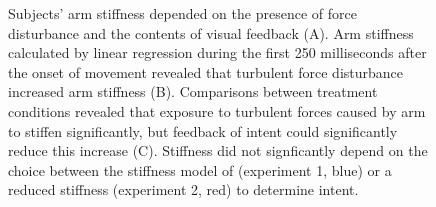 \documentclass{frontiersSCNS} %
\begin{document}

\begin{figure}[t]
\centering
{}
\caption{Subjects' arm stiffness depended on the presence of force disturbance and the contents of visual feedback (A). Arm stiffness calculated by linear regression during the first 250 milliseconds after the onset of movement revealed that turbulent force disturbance increased arm stiffness (B). Comparisons between treatment conditions revealed that exposure to turbulent forces caused by arm to stiffen significantly, but feedback of intent could significantly reduce this increase (C). Stiffness did not signficantly depend on the choice between the stiffness model of \cite{shadmehr1994adaptive} (experiment 1, blue) or a reduced stiffness (experiment 2, red) to determine intent.}
\label{stiffness}
\end{figure}



\end{document}
